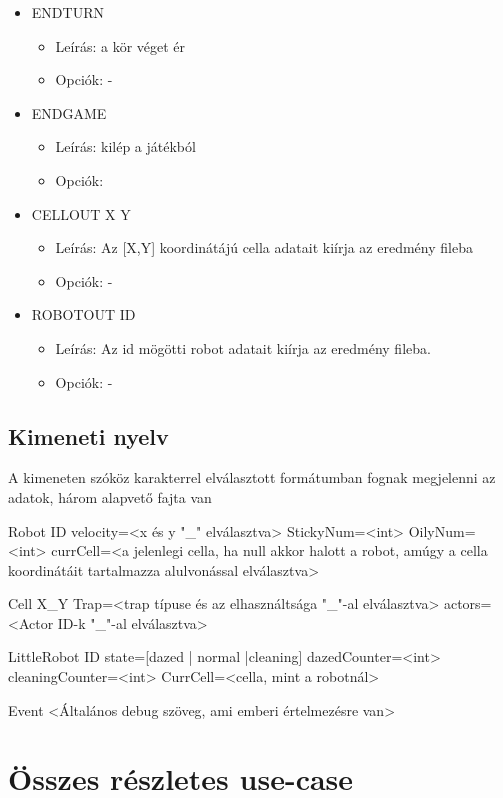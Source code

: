 \begin{itemize}
\item ENDTURN
\begin{itemize}
	\item Leírás: a kör véget ér
	\item Opciók: -
\end{itemize}


\item ENDGAME
\begin{itemize}
	\item Leírás: kilép a játékból
	\item Opciók:
\end{itemize}

\item CELLOUT X Y
\begin{itemize}
	\item Leírás: Az [X,Y] koordinátájú cella adatait kiírja az eredmény fileba
	\item Opciók: -
\end{itemize}

\item ROBOTOUT ID
\begin{itemize}
	\item Leírás: Az id mögötti robot adatait kiírja az eredmény fileba.
	\item Opciók: -
\end{itemize}

\end{itemize}

\subsection{Kimeneti nyelv}
A kimeneten szóköz karakterrel elválasztott formátumban fognak megjelenni az adatok, három alapvető fajta van

Robot ID velocity=<x és y "\_" elválasztva> StickyNum=<int> OilyNum=<int> currCell=<a jelenlegi cella, ha null akkor halott a robot, amúgy a cella koordinátáit tartalmazza alulvonással elválasztva>

Cell X\_Y Trap=<trap típuse és az elhasználtsága "\_"-al elválasztva> actors=<Actor ID-k "\_"-al elválasztva>

LittleRobot ID state=[dazed | normal |cleaning] dazedCounter=<int> cleaningCounter=<int> CurrCell=<cella, mint a robotnál>

Event <Általános debug szöveg, ami emberi értelmezésre van>

\section{Összes részletes use-case}

